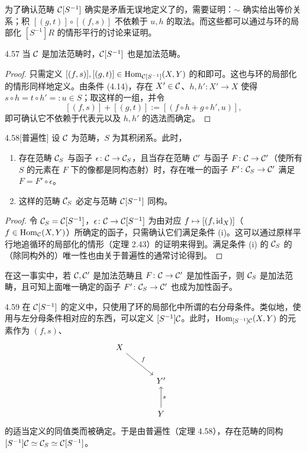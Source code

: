 为了确认范畴 $\mathcal{C}[S^{-1}]$ 确实是矛盾无误地定义了的，需要证明：$\sim$ 确实给出等价关系；积 $[(g,t)]\circ[(f,s)]$ 不依赖于 $u,h$ 的取法。而这些都可以通过与环的局部化 $[S^{-1}]R$ 的情形平行的讨论来证明。

\begin{lemma}{4.57}
当 $\mathcal{C}$ 是加法范畴时，$\mathcal{C}[S^{-1}]$ 也是加法范畴。
\end{lemma}

\begin{proof}
只需定义 $[(f,s)],[(g,t)]\in\operatorname{Hom}_{\mathcal{C}[S^{-1}]}(X,Y)$ 的和即可。这也与环的局部化的情形同样地定义。由条件 (4.14)，存在 $X'\in\mathcal{C}$、$h,h'\colon X'\to X$ 使得 $s\circ h=t\circ h'=:u\in S$；取这样的一组，并令
\[ [(f,s)]+[(g,t)]:=[(f\circ h+g\circ h',u)], \]
即可确认它不依赖于代表元以及 $h,h'$ 的选法而确定。
\end{proof}

\begin{theorem}{4.58}[普遍性]
设 $\mathcal{C}$ 为范畴，$S$ 为其积闭系。此时，
\begin{enumerate}[label=(\roman*)]
  \item 存在范畴 $\mathcal{C}_S$ 与函子 $\epsilon\colon\mathcal{C}\to\mathcal{C}_S$，且当存在范畴 $\mathcal{C}'$ 与函子 $F\colon\mathcal{C}\to\mathcal{C}'$（使所有 $S$ 的元素在 $F$ 下的像都是同构态射）时，存在唯一的函子 $F'\colon\mathcal{C}_S\to\mathcal{C}'$ 满足 $F=F'\circ\epsilon$。
  \item 这样的范畴 $\mathcal{C}_S$ 必定与范畴 $\mathcal{C}[S^{-1}]$ 同构。
\end{enumerate}
\end{theorem}

\begin{proof}
令 $\mathcal{C}_S=\mathcal{C}[S^{-1}]$，$\epsilon\colon\mathcal{C}\to\mathcal{C}[S^{-1}]$ 为由对应 $f\mapsto[(f,\mathrm{id}_X)]$（$f\in\operatorname{Hom}_{\mathcal{C}}(X,Y)$）所确定的函子，只需确认它们满足条件 (i)。这可以通过原样平行地追循环的局部化的情形（定理 2.43）的证明来得到。满足条件 (i) 的 $\mathcal{C}_S$ 的（除同构外的）唯一性也由关于普遍性的通常讨论得到。
\end{proof}

在这一事实中，若 $\mathcal{C},\mathcal{C}'$ 是加法范畴且 $F\colon\mathcal{C}\to\mathcal{C}'$ 是加性函子，则 $\mathcal{C}_S$ 是加法范畴，且可知上面唯一确定的函子 $F'\colon\mathcal{C}_S\to\mathcal{C}'$ 也成为加性函子。

\begin{remark}{4.59}
在 $\mathcal{C}[S^{-1}]$ 的定义中，只使用了环的局部化中所谓的右分母条件。类似地，使用与左分母条件相对应的东西，可以定义 $[S^{-1}]\mathcal{C}$。此时，$\operatorname{Hom}_{[S^{-1}]\mathcal{C}}(X,Y)$ 的元素作为 $(f,s)$、
\[\begin{tikzcd}[row sep=2.6em, column sep=3.2em]
  X \arrow[dr,"f"] & & \\
  & Y' & \\
  & Y \arrow[u,"s"']
\end{tikzcd}\]
的适当定义的同值类而被确定。于是由普遍性（定理 4.58），存在范畴的同构 $[S^{-1}]\mathcal{C}\simeq\mathcal{C}_S\simeq\mathcal{C}[S^{-1}]$。
\end{remark}


